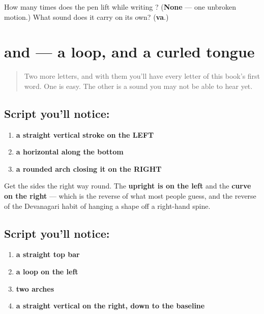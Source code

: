 \begin{tcolorbox}[breakable,colback=teal!4,colframe=teal!35!black,title={Before you move on}]
How many times does the pen lift while writing ? (\textbf{None} — one unbroken motion.) What sound does it carry on its own? (\textbf{va}.)
\end{tcolorbox}
\section[\texorpdfstring{\ta{ம}, \ta{ண} (ma, ṇa)}{ம, ண (ma, ṇa)}]{ and  — a loop, and a curled tongue}

\label{lesson:TA-W02-ma-retroflex-na}



\begin{quote}
Two more letters, and with them you'll have every letter of this book's first word. One is easy. The other is a sound you may not be able to hear yet.
\end{quote}

\subsection*{Script you'll notice: }

\begin{enumerate}
\raggedright
  \item \textbf{a straight vertical stroke on the LEFT}
  \item \textbf{a horizontal along the bottom}
  \item \textbf{a rounded arch closing it on the RIGHT}
\end{enumerate}

Get the sides the right way round. The \textbf{upright is on the left} and the \textbf{curve on the right} — which is the reverse of what most people guess, and the reverse of the Devanagari habit of hanging a shape off a right-hand spine.

\subsection*{Script you'll notice: }
\begin{enumerate}
\raggedright
  \item \textbf{a straight top bar}
  \item \textbf{a loop on the left}
  \item \textbf{two arches}
  \item \textbf{a straight vertical on the right, down to the baseline}
\end{enumerate}

